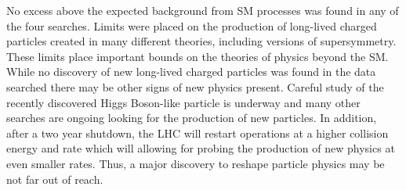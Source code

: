 No excess above the expected background from SM processes was found in any of the four searches. Limits were placed on the production of long-lived charged
particles created in many different theories, including versions of supersymmetry. These limits place important bounds on the theories
of physics beyond the SM. While no discovery of new long-lived charged particles was found in the data searched there may be other signs of
new physics present. Careful study of the recently discovered Higgs Boson-like particle is underway and many other searches are ongoing looking for the production
of new particles. In addition, after a two year shutdown, the LHC will restart operations at a higher collision energy and rate which will allowing for probing
the production of new physics at even smaller rates. 
Thus, a major discovery to reshape particle physics may be not far out of reach.




